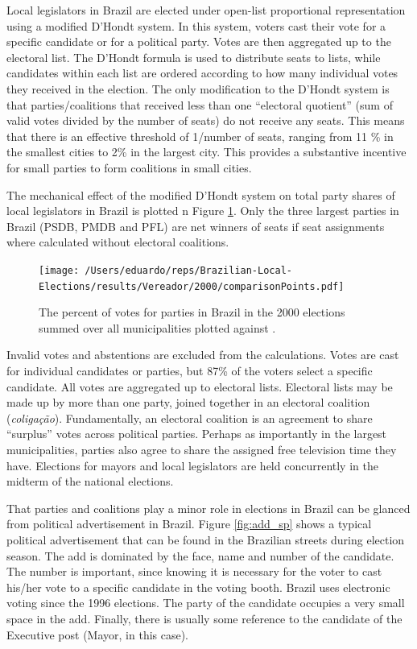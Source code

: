 Local legislators in Brazil are elected under open-list proportional representation using a modified D'Hondt system. In this system,  voters  cast their vote for a specific candidate or for a political party. Votes are then aggregated up to the electoral list. The D'Hondt formula is used to distribute seats to lists, while  candidates within each list are ordered according to how many individual votes they received in the election.  The only modification to the D'Hondt system is that parties/coalitions that received less than one ``electoral quotient'' (sum of valid votes divided by the number of seats) do not receive any seats. This means that there is an effective threshold of 1/number of seats, ranging from 11 \% in the smallest cities to 2\% in the largest city. This provides a substantive incentive for small parties to form coalitions in small cities. 

The mechanical effect of the modified D'Hondt system on total party shares of local legislators in Brazil is plotted n Figure \ref{fig:comp}.  Only the three largest parties in Brazil (PSDB, PMDB and PFL) are net winners of seats if seat assignments where calculated without electoral coalitions.   

 \begin{figure}
  \centering
  \texttt{[image: /Users/eduardo/reps/Brazilian-Local-Elections/results/Vereador/2000/comparisonPoints.pdf]}
  \caption{The percent of votes for parties in Brazil in the 2000 elections summed over all municipalities plotted against .  }
  \label{fig:comp}
\end{figure}


Invalid votes and abstentions are excluded from the calculations. Votes are cast for individual candidates or parties, but  87\% of the voters select a specific candidate. All votes are aggregated up to electoral lists. Electoral lists may be made up by more than one party, joined together in an electoral coalition (\emph{coligação}). Fundamentally, an electoral coalition is an agreement to share ``surplus'' votes across political parties. Perhaps as importantly in the largest municipalities, parties also agree to share the assigned free television time they have. Elections for mayors and local legislators are held concurrently in the midterm of the national elections.

That parties and coalitions play a minor role in elections in Brazil can be glanced from political advertisement in Brazil.  Figure \ref{fig:add_sp} shows a typical political advertisement that can be found in the Brazilian streets during election season. The add is dominated by the face,   name and number of the candidate. The number is important, since knowing it is necessary for the voter to cast his/her vote to a specific candidate in the voting booth. Brazil uses electronic voting since the 1996 elections. The party of the candidate occupies a very small space in the add. Finally, there is usually some reference to the candidate of the Executive post (Mayor, in this case). 

